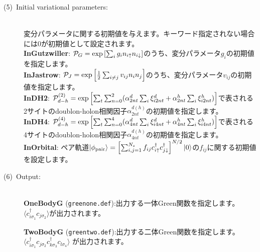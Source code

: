 \begin{description}
\item[(5)~Initial variational parameters:]
~\\ 変分パラメータに関する初期値を与えます。キーワード指定されない場合には$0$が初期値として設定されます。
~\\{\bf InGutzwiller}: ${\cal P}_G=\exp\left[ \sum_i g_i n_{i\uparrow} n_{i\downarrow} \right]$のうち、変分パラメータ$g_i$の初期値を指定します。
~\\{\bf InJastrow}: ${\cal P}_J=\exp\left[\frac{1}{2} \sum_{i\neq j} v_{ij} n_i n_j\right]$のうち、変分パラメータ$v_{ij}$の初期値を指定します。
~\\{\bf InDH2}:  ${\cal P}_{d-h}^{(2)}= \exp \left[ \sum_t \sum_{n=0}^2 (\alpha_{2nt}^d \sum_{i}\xi_{i2nt}^d+\alpha_{2nt}^h \sum_{i}\xi_{i2nt}^h)\right]$で表される2サイトのdoublon-holon相関因子$\alpha_{2nt}^{d(h)}$の初期値を指定します。
~\\{\bf InDH4}:  ${\cal P}_{d-h}^{(4)}= \exp \left[ \sum_t \sum_{n=0}^4 (\alpha_{4nt}^d \sum_{i}\xi_{i4nt}^d+\alpha_{4nt}^h \sum_{i}\xi_{i4nt}^h)\right]$で表される4サイトのdoublon-holon相関因子$\alpha_{4nt}^{d(h)}$の初期値を指定します。
~\\{\bf InOrbital}: ペア軌道$|\phi_{\rm pair} \rangle = \left[\sum_{i, j=1}^{N_s} f_{ij}c_{i\uparrow}^{\dag}c_{j\downarrow}^{\dag} \right]^{N/2}|0 \rangle$の$ f_{ij}$に関する初期値を設定します。

\item[(6)~Output:]
~\\{\bf OneBodyG }(\verb|greenone.def|):出力する一体Green関数を指定します。
 $\langle c^{\dagger}_{i\sigma_1}c_{j\sigma_2}\rangle$が出力されます。

 {\bf TwoBodyG }(\verb|greentwo.def|):出力する二体Green関数を指定します。
 $\langle c^{\dagger}_{i\sigma_1}c_{j\sigma_2}c^{\dagger}_{k \sigma_3}c_{l\sigma_4}\rangle$
が出力されます。
\end{description}

